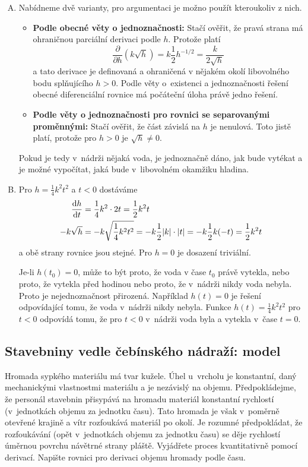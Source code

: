 \reseni
\begin{enumerate}[A)]
\item Nabídneme dvě  varianty, pro argumentaci je možno použít kteroukoliv z nich. 
  \begin{itemize}
  \item \textbf{Podle obecné věty o jednoznačnosti:} Stačí ověřit, že pravá strana má ohraničnou parciální derivaci podle $h$. Protože platí
    $$\frac{\partial }{\partial h}(k\sqrt h)=k\frac 12
    h^{-1/2}=\frac{k}{2\sqrt h}$$ a tato derivace je definovaná a
    ohraničená v nějakém okolí libovolného bodu splňujícího $h>0$.
    Podle věty o existenci a jednoznačnosti řešení obecné
    diferenciální rovnice má počáteční úloha právě jedno řešení.
  \item \textbf{Podle věty o jednoznačnosti pro rovnici se separovanými proměnnými: } Stačí ověřit,
    že část závislá na $h$ je nenulová. Toto jistě platí, protože pro
    $h>0$ je $\sqrt{h}\neq 0$.
\end{itemize}
Pokud je tedy v nádrži nějaká voda, je jednoznačně dáno,
    jak bude vytékat a je možné vypočítat, jaká bude v libovolném
    okamžiku hladina.
  
\item
  Pro $h=\frac 14 k^2 t^2$ a $t<0$ dostáváme
  \begin{equation*}
    \begin{aligned}
      \frac{\mathrm{d}h}{\mathrm{d}t}&=\frac 14 k^2 \cdot 2t = \frac 12 k^2 t\\
      -k\sqrt h&=-k\sqrt{\frac 14 k^2 t^2} = - k \frac 12 |k| \cdot |t| =
      - k \frac 12 k (-t) = \frac 12 k^2 t
    \end{aligned}
  \end{equation*}
  a obě strany rovnice jsou stejné. Pro $h=0$ je dosazení triviální.
  
  Je-li $h(t_0)=0$, může to být proto, že voda v čase $t_0$ právě vytekla, nebo proto, že vytekla před hodinou nebo proto, že v nádrži nikdy voda nebyla. Proto je nejednoznačnost přirozená. Například $h(t)=0$ je řešení odpovídající tomu, že voda v nádrži nikdy nebyla. Funkce $h(t)=\frac 14 k^2t^2$ pro $t<0$ odpovídá tomu, že pro $t<0$ v nádrži voda byla a vytekla v čase $t=0$.
\end{enumerate}

\konec


\stranka



\subsection{Stavebniny vedle čebínského nádraží: model} Hromada sypkého
materiálu má tvar kužele. Úhel u~vrcholu je konstantní, daný
mechanickými vlastnostmi materiálu a je nezávislý na
objemu. Předpokládejme, že personál stavebnin přisypává na hromadu
materiál konstantní rychlostí (v jednotkách objemu za jednotku
času). Tato hromada je však v poměrně otevřené krajině a vítr
rozfoukává materiál po okolí. Je rozumné předpokládat, že rozfoukávání (opět v jednotkách objemu za jednotku
času)
se děje rychlostí úměrnou povrchu návětrné strany pláště. Vyjádřete proces kvantitativně pomocí derivací.
Napište rovnici pro derivaci objemu hromady podle času. 

